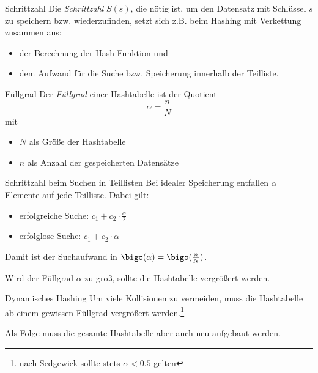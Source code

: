\begin{defi}{Schrittzahl}
    Die \emph{Schrittzahl} $S(s)$, die nötig ist, um den Datensatz mit Schlüssel $s$ zu speichern bzw. wiederzufinden, setzt sich z.B. beim Hashing mit Verkettung zusammen aus:
    \begin{itemize}
        \item der Berechnung der Hash-Funktion und
        \item dem Aufwand für die Suche bzw. Speicherung innerhalb der Teilliste.
    \end{itemize}
\end{defi}

\begin{defi}{Füllgrad}
    Der \emph{Füllgrad} einer Hashtabelle ist der Quotient
    $$
        \alpha = \frac{n}{N}
    $$
    mit
    \begin{itemize}
        \item $N$ als Größe der Hashtabelle
        \item $n$ als Anzahl der gespeicherten Datensätze
    \end{itemize}
\end{defi}

\begin{example}{Schrittzahl beim Suchen in Teillisten}
    Bei idealer Speicherung entfallen $\alpha$ Elemente auf jede Teilliste.
    Dabei gilt:
    \begin{itemize}
        \item erfolgreiche Suche: $c_1 + c_2 \cdot \frac{\alpha}{2}$
        \item erfolglose Suche: $c_1 + c_2 \cdot \alpha$
    \end{itemize}
    Damit ist der Suchaufwand in $\bigo(\alpha) = \bigo(\frac{n}{N})$.

    Wird der Füllgrad $\alpha$ zu groß, sollte die Hashtabelle vergrößert werden.
\end{example}

\begin{defi}{Dynamisches Hashing}
    Um viele Kollisionen zu vermeiden, muss die Hashtabelle ab einem gewissen Füllgrad vergrößert werden.\footnote{nach Sedgewick sollte stets $\alpha < 0.5$ gelten}

    Als Folge muss die gesamte Hashtabelle aber auch neu aufgebaut werden.
\end{defi}

